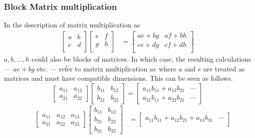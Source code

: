 \documentclass[MathsNotesBase.tex]{subfiles}
\begin{document}
{		\subsubsection{Block Matrix multiplication}\label{sssection:block-matrix-multiplication}
		In the description of matrix multiplication as
		\begin{align*}
		\begin{bmatrix}
		a & b \\
		c & d \\
		\end{bmatrix}
		\begin{bmatrix}
		e & f \\
		g & h \\
		\end{bmatrix}
		&=
		\begin{bmatrix}
		ae + bg & af + bh \\
		ce + dg & cf + dh \\
		\end{bmatrix}
		\end{align*}
		${ a,b,\dots,h }$ could also be blocks of matrices. In which case, the resulting calculations --- ${ ae + bg }$ etc. --- refer to matrix multiplication $ae$ where $a$ and $e$ are treated as matrices and must have compatible dimensions. This can be seen as follows.
		\[ 
			\begin{bmatrix}
			a_{11} & a_{12}\\
			a_{21} & a_{22}
			\end{bmatrix} 
			\begin{bmatrix}
			b_{11} & b_{12}\\
			b_{21} & b_{22}
			\end{bmatrix}  =
			\begin{bmatrix}
			a_{11}b_{11} + a_{12}b_{21} & \cdots\\
			a_{21}b_{11} + a_{22}b_{21} & \cdots
			\end{bmatrix} 
		\]
		\begin{align*}
		&& \begin{bmatrix}
			a_{11} & a_{12} & a_{13}\\
			a_{21} & a_{22} & a_{23}
			\end{bmatrix} 
			\begin{bmatrix}
			b_{11} & b_{12}\\
			b_{21} & b_{22} \\
			b_{31} & b_{32}
			\end{bmatrix} &= 
			\begin{bmatrix}
			a_{11}b_{11} + a_{12}b_{21} + a_{13}b_{31} & \cdots\\

\end{bmatrix}
\end{align*}}
\end{document}
